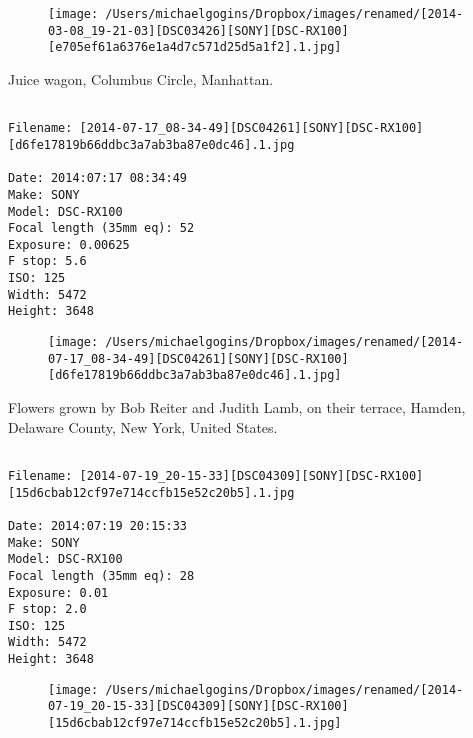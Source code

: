 \documentclass[11pt,letter,DIV=14,paper=landscape]{scrbook}
\begin{document}
\begin{figure}
\texttt{[image: /Users/michaelgogins/Dropbox/images/renamed/[2014-03-08\_19-21-03][DSC03426][SONY][DSC-RX100][e705ef61a6376e1a4d7c571d25d5a1f2].1.jpg]}
\end{figure}
    
\clearpage
\noindent Juice wagon, Columbus Circle, Manhattan.
\noindent
\begin{lstlisting}

Filename: [2014-07-17_08-34-49][DSC04261][SONY][DSC-RX100][d6fe17819b66ddbc3a7ab3ba87e0dc46].1.jpg

Date: 2014:07:17 08:34:49
Make: SONY
Model: DSC-RX100
Focal length (35mm eq): 52
Exposure: 0.00625
F stop: 5.6
ISO: 125
Width: 5472
Height: 3648
\end{lstlisting}
\clearpage

\begin{figure}
\texttt{[image: /Users/michaelgogins/Dropbox/images/renamed/[2014-07-17\_08-34-49][DSC04261][SONY][DSC-RX100][d6fe17819b66ddbc3a7ab3ba87e0dc46].1.jpg]}
\end{figure}
    
\clearpage
\noindent Flowers grown by Bob Reiter and Judith Lamb, on their terrace, Hamden, Delaware County, New York, United States.
\noindent
\begin{lstlisting}

Filename: [2014-07-19_20-15-33][DSC04309][SONY][DSC-RX100][15d6cbab12cf97e714ccfb15e52c20b5].1.jpg

Date: 2014:07:19 20:15:33
Make: SONY
Model: DSC-RX100
Focal length (35mm eq): 28
Exposure: 0.01
F stop: 2.0
ISO: 125
Width: 5472
Height: 3648
\end{lstlisting}
\clearpage

\begin{figure}
\texttt{[image: /Users/michaelgogins/Dropbox/images/renamed/[2014-07-19\_20-15-33][DSC04309][SONY][DSC-RX100][15d6cbab12cf97e714ccfb15e52c20b5].1.jpg]}
\end{figure}
    
\end{document}
